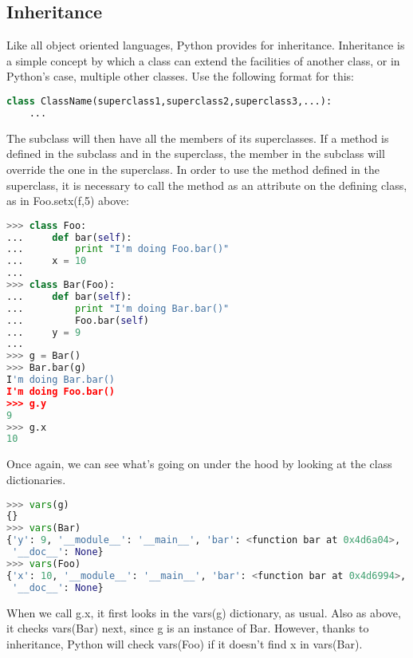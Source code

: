 \subsection{Inheritance}
Like all object oriented languages, Python provides for inheritance. Inheritance
is a simple concept by which a class can extend the facilities of another class,
or in Python's case, multiple other classes. Use the following format for this:
\lstset{basicstyle=\scriptsize, numbers=left, captionpos=b, tabsize=4}
\begin{lstlisting}[caption=Inheritance,language={Python},
xleftmargin=15pt, label=lst:inheritance]
class ClassName(superclass1,superclass2,superclass3,...):
    ...
\end{lstlisting}

The subclass will then have all the members of its superclasses. If a method is
defined in the subclass and in the superclass, the member in the subclass will
override the one in the superclass. In order to use the method defined in the
superclass, it is necessary to call the method as an attribute on the defining
class, as in Foo.setx(f,5) above:
\lstset{basicstyle=\scriptsize, numbers=left, captionpos=b, tabsize=4}
\begin{lstlisting}[caption=Inheritance Example,language={Python},
xleftmargin=15pt, label=lst:inheritanceexample]
>>> class Foo:
...     def bar(self):
...         print "I'm doing Foo.bar()"
...     x = 10
...
>>> class Bar(Foo):
...     def bar(self):
...         print "I'm doing Bar.bar()"
...         Foo.bar(self)
...     y = 9
...
>>> g = Bar()
>>> Bar.bar(g)
I'm doing Bar.bar()
I'm doing Foo.bar()
>>> g.y
9
>>> g.x
10
\end{lstlisting}

Once again, we can see what's going on under the hood by looking at the class
dictionaries.
\lstset{basicstyle=\scriptsize, numbers=left, captionpos=b, tabsize=4}
\begin{lstlisting}[caption=Inherited Member,language={Python},
xleftmargin=15pt, label=lst:]
>>> vars(g)
{}
>>> vars(Bar)
{'y': 9, '__module__': '__main__', 'bar': <function bar at 0x4d6a04>,
 '__doc__': None}
>>> vars(Foo)
{'x': 10, '__module__': '__main__', 'bar': <function bar at 0x4d6994>,
 '__doc__': None}
\end{lstlisting}

When we call g.x, it first looks in the vars(g) dictionary, as usual. Also as
above, it checks vars(Bar) next, since g is an instance of Bar. However, thanks
to inheritance, Python will check vars(Foo) if it doesn't find x in vars(Bar).

